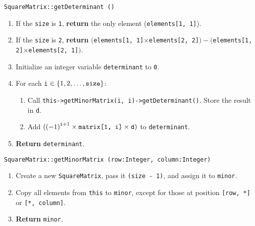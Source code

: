 \vspace{5mm}
{\tt SquareMatrix::getDeterminant ()}
\begin{enumerate}
	\item	If the {\tt size} is {\tt 1}, {\bf return} the only element ({\tt elements[1, 1]}).
	\item	If the {\tt size} is {\tt 2}, {\bf return}
			$(${\tt elements[1, 1]}$\times${\tt elements[2, 2]}$) - (${\tt elements[1, 2]}$\times${\tt elements[2, 1]}$)$.
	\item	Initialize an integer variable {\tt determinant} to {\tt 0}.
	\item	For each {\tt i} $\in \{1, 2, \dots, \text{\tt size}\}$:
		\begin{enumerate}
			\item	Call {\tt this->getMinorMatrix(i, i)->getDeterminant()}. Store the result in {\tt d}.
			\item	Add $({(-1)}^{\text{\tt i} + 1} \times \text{\tt matrix[1, i]} \times \text{\tt d})$ to
					{\tt determinant}.
		\end{enumerate}
	\item	{\bf Return} {\tt determinant}.
\end{enumerate}
\vspace{5mm}
{\tt SquareMatrix::getMinorMatrix (row:Integer, column:Integer)}
\begin{enumerate}
	\item	Create a new {\tt SquareMatrix}, pass it {\tt (size - 1)}, and assign it to {\tt minor}.
	\item	Copy all elements from {\tt this} to {\tt minor}, except for those at position {\tt[row, *]}
			or {\tt [*, column]}.
	\item	{\bf Return} {\tt minor}.
\end{enumerate}

\clearpage
\sourcecode




